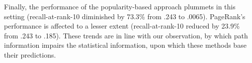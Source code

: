 \documentclass[11pt,oneside]{book}
\begin{document}
Finally, the performance of the popularity-based approach plummets in this setting (recall-at-rank-10 diminished by 73.3\% from .243 to .0065). PageRank's performance is affected to a lesser extent (recall-at-rank-10 reduced by 23.9\% from .243 to .185). These trends are in line with our observation, by which path information impairs the statistical information, upon which these methods base their predictions.

\end{document}
